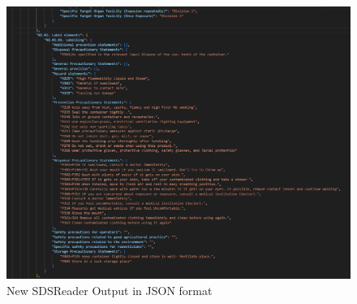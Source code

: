 \documentclass[a4paper,12pt,twoside]{report}
\begin{document}
\begin{figure}[H]
		\includegraphics[width=\textwidth, keepaspectratio ]{images/newSDSReader}
	\caption[Old SDSReader]{New SDSReader Output in JSON format}
\label{newSDSReader}
\end{figure}
\end{document}
